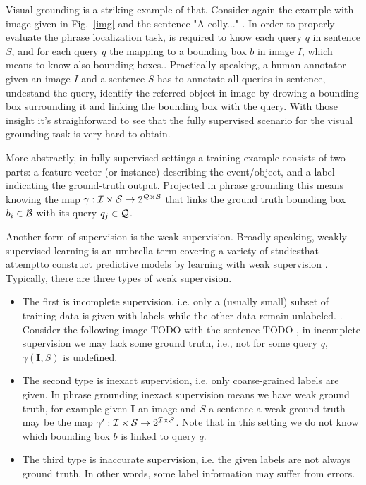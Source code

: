 Visual grounding is a striking example of that. Consider again the
example with image given in Fig.~\ref{img} and the sentence "A
colly..." .
 In order to properly
evaluate the phrase localization task, is required to know each query
$q$  in sentence $S$, and for each query
$q$ the mapping to a bounding box $b$ in image $I$, which means to
know also bounding boxes.. Practically
speaking, a human annotator given an image $I$ and a sentence $S$ has
to annotate all queries in sentence, undestand the query, identify the
referred object in image by drowing a bounding box surrounding it and
linking the bounding box with the query. With those insight it's
straighforward to see that the fully supervised scenario for the
visual grounding task is very hard to obtain. 

More abstractly, in fully supervised settings a training example
consists of two parts: a feature vector (or instance) describing the
event/object, and a label indicating the ground-truth output.
Projected in phrase grounding this means knowing the map $\gamma :
\mathcal{I} \times \mathcal{S} \rightarrow 2^{\mathcal{Q} \times \mathcal{B}}$ that links the
ground truth bounding box $b_i \in \mathcal{B}$ with its query $q_j \in
\mathcal{Q}$.

Another form of supervision is the weak supervision. Broadly speaking,
weakly supervised learning is an umbrella term covering a variety of
studiesthat attemptto construct predictive models by learning with
weak supervision . Typically, there are three types of weak supervision. 

\begin{itemize}
    \item The first is incomplete supervision, i.e. only a (usually
small) subset of training data is given with labels while the other
data remain unlabeled. . Consider the following image TODO with the sentence
TODO \todo{}, in incomplete supervision we may lack some ground truth,
i.e., not for some query $q$, $\gamma(\bm{I}, S)$ is undefined.
    \item The second type is inexact supervision, i.e. only
coarse-grained labels are given. In phrase grounding inexact
supervision means we have weak ground truth, for example given
$\bm{I}$ an image and $S$ a sentence a weak ground truth may be the
map $\gamma' : \mathcal{I} \times \mathcal{S} \rightarrow 2^{\mathcal{I} \times \mathcal{S}}$.
Note that in this setting we do not know which bounding box $b$ is
linked to query $q$. 
    \item The third type is inaccurate supervision, i.e. the given
labels are not always ground truth.  In other words, some label
information may suffer from errors.
\end{itemize}

